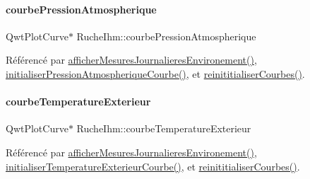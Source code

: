 \mbox{\label{class_ruche_ihm_aa6685f1fc20aa4459eab3b0bb3c4d1ef}} 
\paragraph{\texorpdfstring{courbe\+Pression\+Atmospherique}{courbePressionAtmospherique}}
{\footnotesize\ttfamily Qwt\+Plot\+Curve$\ast$ Ruche\+Ihm\+::courbe\+Pression\+Atmospherique\hspace{0.3cm}{\ttfamily [private]}}



Référencé par \hyperlink{class_ruche_ihm_a5ee5942435915ca134765f42ff4b9061}{afficher\+Mesures\+Journalieres\+Environement()}, \hyperlink{class_ruche_ihm_ab070a28e49cab512d62ca449473706e5}{initialiser\+Pression\+Atmospherique\+Courbe()}, et \hyperlink{class_ruche_ihm_a098911c0edd701f7892e3d140ebffbd9}{reinititialiser\+Courbes()}.

\mbox{\label{class_ruche_ihm_a68e72873a859840d3c91b147b8559118}} 
\paragraph{\texorpdfstring{courbe\+Temperature\+Exterieur}{courbeTemperatureExterieur}}
{\footnotesize\ttfamily Qwt\+Plot\+Curve$\ast$ Ruche\+Ihm\+::courbe\+Temperature\+Exterieur\hspace{0.3cm}{\ttfamily [private]}}



Référencé par \hyperlink{class_ruche_ihm_a5ee5942435915ca134765f42ff4b9061}{afficher\+Mesures\+Journalieres\+Environement()}, \hyperlink{class_ruche_ihm_adb1039cc926ceb318c5d851f09d896c1}{initialiser\+Temperature\+Exterieur\+Courbe()}, et \hyperlink{class_ruche_ihm_a098911c0edd701f7892e3d140ebffbd9}{reinititialiser\+Courbes()}.

\mbox{\label{class_ruche_ihm_a6ce372c8df13bb78c09705432dcfcf58}} 

